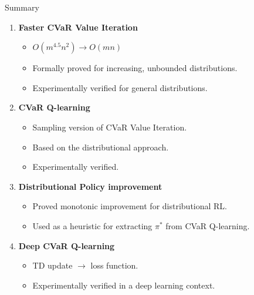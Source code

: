 \documentclass{beamer}
\begin{document}

\begin{frame}{Summary}
\begin{enumerate}
\item \textbf{Faster CVaR Value Iteration} 
\begin{itemize}
\item $O(m^{4.5} n^2)\to O(m  n)$
\item Formally proved for increasing, unbounded distributions.
\item Experimentally verified for general distributions.
\end{itemize}
\item \textbf{CVaR Q-learning} 
\begin{itemize}
\item Sampling version of CVaR Value Iteration.
\item Based on the distributional approach.
\item Experimentally verified.
\end{itemize}
\item \textbf{Distributional Policy improvement}
\begin{itemize}
\item Proved monotonic improvement for distributional RL.
\item Used as a heuristic for extracting $\pi^*$ from CVaR Q-learning.
\end{itemize}
\item \textbf{Deep CVaR Q-learning}
\begin{itemize}
\item TD update $\to$ loss function.
\item Experimentally verified in a deep learning context.
\end{itemize}
\end{enumerate}
\end{frame}


%
\end{document}
